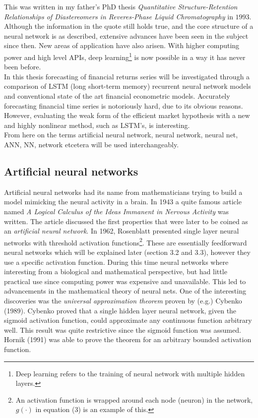 \documentclass[12pt, letterpaper]{amsart}%
\begin{document}
This was written in my father's PhD thesis \textit{Quantitative Structure-Retention Relationships of Diastereomers in Reveres-Phase Liquid Chromatography} in $1993$. Although the information in the quote still holds true, and the core structure of a neural network is as described, extensive advances have been seen in the subject since then. New areas of application have also arisen. With higher computing power and high level APIs, deep learning\footnote{Deep learning refers to the training of neural network with multiple hidden layers.} is now possible in a way it has never been before.
\\

In this thesis forecasting of financial returns series will be investigated through a comparison of LSTM (long short-term memory) recurrent neural network models and conventional state of the art financial econometric models. Accurately forecasting financial time series is notoriously hard, due to its obvious reasons. However, evaluating the weak form of the efficient market hypothesis with a new and highly nonlinear method, such as LSTM's, is interesting.
\\

From here on the terms artificial neural network, neural network, neural net, ANN, NN, network etcetera will be used interchangeably.

\subsection{Artificial neural networks}
Artificial neural networks had its name from mathematicians trying to build a model mimicking the neural activity in a brain. In 1943 a quite famous article named \textit{A Logical Calculus of the Ideas Immanent in Nervous Activity} was written. The article discussed the first properties that were later to be coined as an \textit{artificial neural network}. In 1962, Rosenblatt presented single layer neural networks with threshold activation functions\footnote{An activation function is wrapped around each node (neuron) in the network, $g(\cdot)$ in equation (3) is an example of this.}. These are essentially feedforward neural networks which will be explained later (section 3.2 and 3.3), however they use a specific activation function. During this time neural networks where interesting from a biological and mathematical perspective, but had little practical use since computing power was expensive and unavailable. This led to advancements in the mathematical theory of neural nets. One of the interesting discoveries was the \textit{universal approximation theorem} proven by (e.g.) Cybenko (1989). Cybenko proved that a single hidden layer neural network, given the sigmoid activation function, could approximate any continuous function arbitrary well. This result was quite restrictive since the sigmoid function was assumed. Hornik (1991) was able to prove the theorem for an arbitrary bounded activation function.
\\
\end{document}
